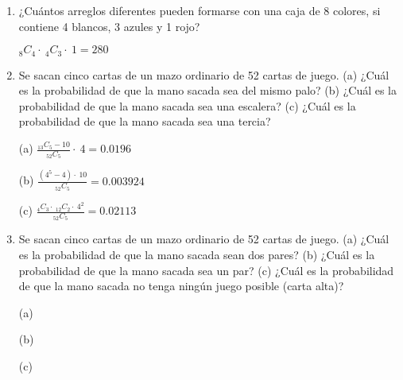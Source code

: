 \documentclass[a4paper, 12pt]{article}
\newcommand{\Pspace}{0.5cm}
\newcommand{\Aspace}{0.2cm}
\begin{document}
\begin{enumerate}
    \vspace{\Aspace}
    (c) { \color{azul} $_{12}C_{2} = 66$ }
    
    \vspace{\Aspace}
    (d) { \color{azul} $_{20}C_{2} = 190$ }


    \vspace{\Pspace}
    \item ¿Cuántos arreglos diferentes pueden formarse con una caja de 8 colores, si contiene 4 blancos, 3 azules y 1 rojo?
    \vspace{\Aspace} \par
        { \color{azul} $_{8}C_{4} \cdot\ _{4}C_{3} \cdot\ 1 = 280$ }

    
    \newpage
    \vspace{\Pspace}
    \item Se sacan cinco cartas de un mazo ordinario de 52 cartas de juego. (a) ¿Cuál es la probabilidad de que la mano sacada sea del mismo palo? (b) ¿Cuál es la probabilidad de que la mano sacada sea una escalera? (c) ¿Cuál es la probabilidad de que la mano sacada sea una tercia?
    \vspace{\Aspace} \par
        (a) { \color{azul} $\frac{_{13}C_{5}-10}{_{52}C_{5}} \cdot\ 4 = 0{.}0196$ }
    
    \vspace{\Aspace}
    (b) { \color{azul} $\frac{(4^{5}-4) \cdot\ 10}{_{52}C_{5}} = 0{.}003924$ }
    
    \vspace{\Aspace}
    (c) { \color{azul} $\frac{_{4}C_{3} \cdot\ _{12}C_{2} \cdot\ 4^{2}}{_{52}C_{5}} = 0{.}02113$ }


    \vspace{\Pspace}
    \item Se sacan cinco cartas de un mazo ordinario de 52 cartas de juego. (a) ¿Cuál es la probabilidad de que la mano sacada sean dos pares? (b) ¿Cuál es la probabilidad de que la mano sacada sea un par? (c) ¿Cuál es la probabilidad de que la mano sacada no tenga ningún juego posible (carta alta)?
    \vspace{\Aspace} \par
    (a) { \color{azul}  }
    
    \vspace{\Aspace}
    (b) { \color{azul}  }
    
    \vspace{\Aspace}
    (c) { \color{azul}  }    
\end{enumerate}
\end{document}
